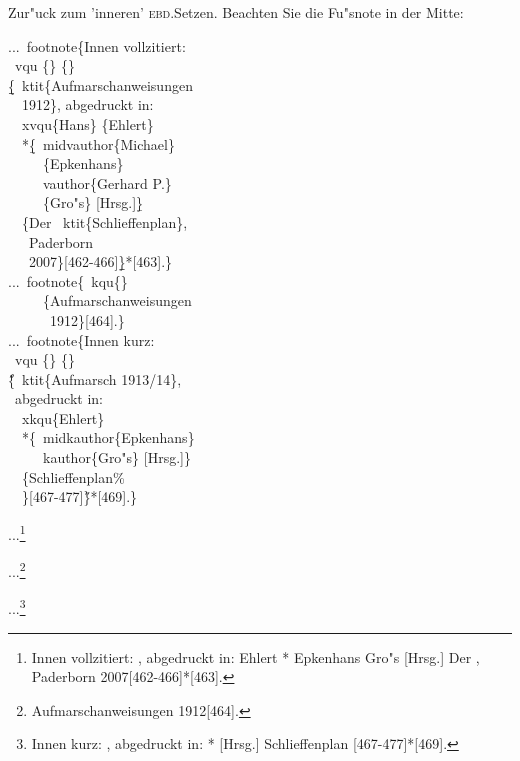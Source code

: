 \documentclass[12pt,a4paper]{article}
\newcommand{\pbs}{\string\ \unskip}
\newcommand{\bs}{\protect\pbs}
\begin{document}
\vfill\noindent
Zur"uck zum 'inneren' \textsc{ebd.}\hy Setzen. Beachten Sie die Fu"snote
in der Mitte:

\vspace{.5ex}
\Doppelbox
{\scriptsize
 ...\bs footnote\{Innen vollzitiert: 
 \\ \bs vqu \{\} \{\} 
 \\ \b{\b{\{}}\bs ktit\{Aufmarschanweisungen 
 \\ \ \ 1912\}, abgedruckt in: 
 \\ \ \bs xvqu\{Hans\} \{Ehlert\} 
 \\{} \ \ *\b{\{}\bs midvauthor\{Michael\}
 \\ \ \ \ \ \ \{Epkenhans\} 
 \\ \ \ \ \ \bs vauthor\{Gerhard P.\} 
 \\ \ \ \ \ \ \{Gro"s\} [Hrsg.]\b{\}} 
 \\ \ \ \{Der \bs ktit\{Schlieffenplan\},
 \\ \ \ \ Paderborn 
 \\ \ \ \ 2007\}[462-466]\b{\b{\}}}*[463].\}
 \\[1ex] ...\bs footnote\{\bs kqu\{\}
 \\ \ \ \ \ \ \{Aufmarschanweisungen 
 \\ \ \ \ \ \ \ 1912\}[464].\}
 \\[1ex] ...\bs footnote\{Innen kurz: 
 \\ \bs vqu \{\} \{\} 
 \\ \H{\{}\bs ktit\{Aufmarsch 1913/14\},
 \\ \ abgedruckt in: 
 \\ \ \bs xkqu\{Ehlert\}
 \\{}\ \ *\{\bs midkauthor\{Epkenhans\} 
 \\ \ \ \ \ \bs kauthor\{Gro"s\} [Hrsg.]\}
 \\ \ \ \{Schlieffenplan\%
 \\ \ \ \}[467-477]\H{\}}*[469].\} 
}
{\vspace{9ex}\showbamem
 ...\footnote{Innen vollzitiert: \vqu {} {} 
   {, 
   abgedruckt in:  {Ehlert}
   *{ {Epkenhans}
      {Gro"s} [Hrsg.]} 
                {Der ,
     Paderborn 2007}[462-466]}*[463].\label{InnVoll}}
                
   ...\footnote{\kqu{} {Aufmarschanweisungen 1912}[464].\label{zweite}}

 ...\footnote{Innen kurz: \vqu {} {} 
    {,
    abgedruckt in: 
    *{  [Hrsg.]}
    {Schlieffenplan%
      }[467-477]}*[469].\label{dritte}}
}
\end{document}
